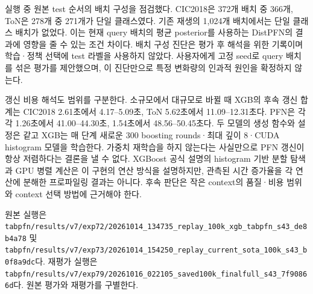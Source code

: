 실행 중 원본 test 순서의 배치 구성을 점검했다. CIC2018은 372개 배치 중 366개, ToN은 278개 중 271개가 단일 클래스였다. 기존 재생의 1,024개 배치에서는 단일 클래스 배치가 없었다. 이는 현재 query 배치의 평균 posterior를 사용하는 DistPFN의 결과에 영향을 줄 수 있는 조건 차이다. 배치 구성 진단은 평가 후 해석을 위한 기록이며 학습·정책 선택에 test 라벨을 사용하지 않았다. 사용자에게 고정 seed로 query 배치를 섞은 평가를 제안했으며, 이 진단만으로 특정 변화량의 인과적 원인을 확정하지 않는다.

갱신 비용 해석도 범위를 구분한다. 소규모에서 대규모로 바뀔 때 XGB의 후속 갱신 합계는 CIC2018 2.61초에서 4.17–5.09초, ToN 5.62초에서 11.09–12.31초다. PFN은 각각 1.26초에서 41.00–44.30초, 1.54초에서 48.56–50.45초다. 두 모델의 생성 함수와 설정은 같고 XGB는 매 단계 새로운 300 boosting rounds·최대 깊이 8·CUDA histogram 모델을 학습한다. 가중치 재학습을 하지 않는다는 사실만으로 PFN 갱신이 항상 저렴하다는 결론을 낼 수 없다. XGBoost 공식 설명의 histogram 기반 분할 탐색과 GPU 병렬 계산은 이 구현의 연산 방식을 설명하지만, 관측된 시간 증가율을 각 연산에 분해한 프로파일링 결과는 아니다. 후속 판단은 작은 context의 품질·비용 범위와 context 선택 방법에 근거해야 한다.

원본 실행은 \texttt{tabpfn/\allowbreak{}\allowbreak{}r\allowbreak{}esults/\allowbreak{}\allowbreak{}v\allowbreak{}7/\allowbreak{}\allowbreak{}exp72/\allowbreak{}\allowbreak{}20261014\allowbreak{}\_\allowbreak{}\allowbreak{}134735\_\allowbreak{}\allowbreak{}replay\_\allowbreak{}\allowbreak{}1\allowbreak{}00k\_\allowbreak{}\allowbreak{}xgb\_\allowbreak{}\allowbreak{}tabpfn\_\allowbreak{}\allowbreak{}s\allowbreak{}43\_\allowbreak{}\allowbreak{}de8b4\allowbreak{}a78} 및 \texttt{tabpfn/\allowbreak{}\allowbreak{}r\allowbreak{}esults/\allowbreak{}\allowbreak{}v\allowbreak{}7/\allowbreak{}\allowbreak{}exp73/\allowbreak{}\allowbreak{}20261014\allowbreak{}\_\allowbreak{}\allowbreak{}154250\_\allowbreak{}\allowbreak{}replay\_\allowbreak{}\allowbreak{}c\allowbreak{}urrent\_\allowbreak{}\allowbreak{}s\allowbreak{}ota\_\allowbreak{}\allowbreak{}100k\allowbreak{}\_\allowbreak{}\allowbreak{}s43\_\allowbreak{}\allowbreak{}b0f\allowbreak{}8a9dc}다. 재평가 실행은 \texttt{tabpfn/\allowbreak{}\allowbreak{}r\allowbreak{}esults/\allowbreak{}\allowbreak{}v\allowbreak{}7/\allowbreak{}\allowbreak{}exp79/\allowbreak{}\allowbreak{}20261016\allowbreak{}\_\allowbreak{}\allowbreak{}022105\_\allowbreak{}\allowbreak{}saved100\allowbreak{}k\_\allowbreak{}\allowbreak{}finalf\allowbreak{}ull\_\allowbreak{}\allowbreak{}s43\_\allowbreak{}\allowbreak{}7f90866d\allowbreak{}}다. 원본 평가와 재평가를 구별한다.



